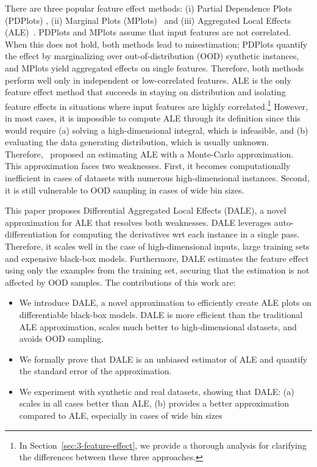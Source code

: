 \documentclass[wcp]{jmlr}
\begin{document}
There are three popular feature effect methods: (i) Partial Dependence Plots (PDPlots) \citep{Friedman2001}, (ii) Marginal Plots (MPlots)~\citep{Apley2020} and (iii) Aggregated Local Effects (ALE)~\citep{Apley2020}. PDPlots and MPlots assume that input features are not correlated. When this does not hold, both methods lead to misestimation; PDPlots quantify the effect by marginalizing over out-of-distribution (OOD) synthetic instances, and MPlots yield aggregated effects on single features. Therefore, both methods perform well only in independent or low-correlated features. ALE is the only feature effect method that succeeds in staying on distribution and isolating feature effects in situations where input features are highly correlated.\footnote{In Section~\ref{sec:3-feature-effect}, we provide a thorough analysis for clarifying the differences between these three approaches.} However, in most cases, it is impossible to compute ALE through its definition since this would require (a) solving a high-dimensional integral, which is infeasible, and (b) evaluating the data generating distribution, which is usually unknown. Therefore,~\cite{Apley2020} proposed an estimating ALE with a Monte-Carlo approximation. This approximation faces two weaknesses. First, it becomes computationally inefficient in cases of datasets with numerous high-dimensional instances. Second, it is still vulnerable to OOD sampling in cases of wide bin sizes.

This paper proposes Differential Aggregated Local Effects (DALE), a novel approximation for ALE that resolves both weaknesses. DALE leverages auto-differentiation for computing the derivatives wrt each instance in a single pass. Therefore, it scales well in the case of high-dimensional inputs, large training sets and expensive black-box models. Furthermore, DALE estimates the feature effect using only the examples from the training set, securing that the estimation is not affected by OOD samples.
%
The contributions of this work are:
%
\begin{itemize}
\item We introduce DALE, a novel approximation to efficiently create ALE plots on differentiable black-box models. DALE is more efficient than the traditional ALE approximation, scales much better to high-dimensional datasets, and avoids OOD sampling.
\item We formally prove that DALE is an unbiased estimator of ALE and quantify the standard error of the approximation.
\item We experiment with synthetic and real datasets, showing that DALE: (a) scales in all cases better than ALE, (b) provides a better approximation compared to ALE, especially in cases of wide bin sizes
\end{itemize}
\end{document}
